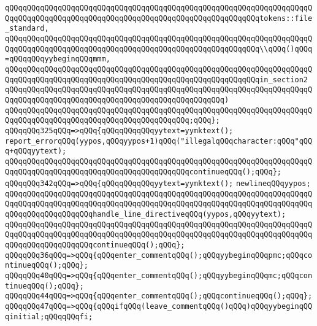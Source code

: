 \verb|qQQqqQQqqQQqqQQqqQQqqQQqqQQqqQQqqQQqqQQqqQQqqQQqqQQqqQQqqQQqqQQqqQQqqQQqqQQqqQQqqQQqqQQqqQQqqQQqqQQqqQQqqQQqqQQqqQQqqQQqqQQqqQQqtokens::file_standard,|\newline
\verb|qQQqqQQqqQQqqQQqqQQqqQQqqQQqqQQqqQQqqQQqqQQqqQQqqQQqqQQqqQQqqQQqqQQqqQQqqQQqqQQqqQQqqQQqqQQqqQQqqQQqqQQqqQQqqQQqqQQqqQQqqQQqqQQq\\qQQq()qQQq=qQQqqQQqyybeginqQQqmmm,|\newline
\verb|qQQqqQQqqQQqqQQqqQQqqQQqqQQqqQQqqQQqqQQqqQQqqQQqqQQqqQQqqQQqqQQqqQQqqQQqqQQqqQQqqQQqqQQqqQQqqQQqqQQqqQQqqQQqqQQqqQQqqQQqqQQqqQQqin_section2|\newline
\verb|qQQqqQQqqQQqqQQqqQQqqQQqqQQqqQQqqQQqqQQqqQQqqQQqqQQqqQQqqQQqqQQqqQQqqQQqqQQqqQQqqQQqqQQqqQQqqQQqqQQqqQQqqQQqqQQqqQQqqQQq)|\newline
\verb|qQQqqQQqqQQqqQQqqQQqqQQqqQQqqQQqqQQqqQQqqQQqqQQqqQQqqQQqqQQqqQQqqQQqqQQqqQQqqQQqqQQqqQQqqQQqqQQqqQQqqQQqqQQqqQQq;qQQq};|\newline
\verb|qQQqqQQq325qQQq=>qQQq{qQQqqQQqqQQqyytext=yymktext();|\newline
\verb|report_errorqQQq(yypos,qQQqyypos+1)qQQq("illegalqQQqcharacter:qQQq"qQQq+qQQqyytext);|\newline
\verb|qQQqqQQqqQQqqQQqqQQqqQQqqQQqqQQqqQQqqQQqqQQqqQQqqQQqqQQqqQQqqQQqqQQqqQQqqQQqqQQqqQQqqQQqqQQqqQQqqQQqqQQqqQQqqQQqcontinueqQQq();qQQq};|\newline
\verb|qQQqqQQq342qQQq=>qQQq{qQQqqQQqqQQqyytext=yymktext();|\newline
\verb|newlineqQQqyypos;|\newline
\verb|qQQqqQQqqQQqqQQqqQQqqQQqqQQqqQQqqQQqqQQqqQQqqQQqqQQqqQQqqQQqqQQqqQQqqQQqqQQqqQQqqQQqqQQqqQQqqQQqqQQqqQQqqQQqqQQqqQQqqQQqqQQqqQQqqQQqqQQqqQQqqQQqqQQqqQQqqQQqqQQqhandle_line_directiveqQQq(yypos,qQQqyytext);|\newline
\verb|qQQqqQQqqQQqqQQqqQQqqQQqqQQqqQQqqQQqqQQqqQQqqQQqqQQqqQQqqQQqqQQqqQQqqQQqqQQqqQQqqQQqqQQqqQQqqQQqqQQqqQQqqQQqqQQqqQQqqQQqqQQqqQQqqQQqqQQqqQQqqQQqqQQqqQQqqQQqqQQqcontinueqQQq();qQQq};|\newline
\verb|qQQqqQQq36qQQq=>qQQq{qQQqenter_commentqQQq();qQQqyybeginqQQqpmc;qQQqcontinueqQQq();qQQq};|\newline
\verb|qQQqqQQq40qQQq=>qQQq{qQQqenter_commentqQQq();qQQqyybeginqQQqmc;qQQqcontinueqQQq();qQQq};|\newline
\verb|qQQqqQQq44qQQq=>qQQq{qQQqenter_commentqQQq();qQQqcontinueqQQq();qQQq};|\newline
\verb|qQQqqQQq47qQQq=>qQQq{qQQqifqQQq(leave_commentqQQq()qQQq)qQQqyybeginqQQqinitial;qQQqqQQqfi;|\newline
